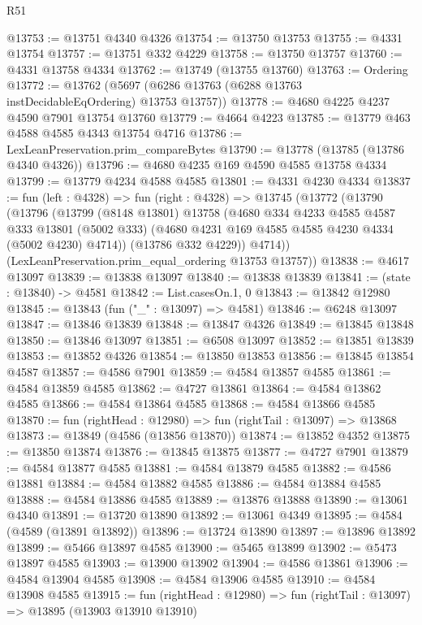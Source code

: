 \begin{lexlean}{R51}
\begin{coremodule}
@13753 := @13751 @4340 @4326
@13754 := @13750 @13753
@13755 := @4331 @13754
@13757 := @13751 @332 @4229
@13758 := @13750 @13757
@13760 := @4331 @13758 @4334
@13762 := @13749 (@13755 @13760)
@13763 := Ordering
@13772 := @13762 (@5697 (@6286 @13763 (@6288 @13763 instDecidableEqOrdering) @13753 @13757))
@13778 := @4680 @4225 @4237 @4590 @7901 @13754 @13760
@13779 := @4664 @4223
@13785 := @13779 @463 @4588 @4585 @4343 @13754 @4716
@13786 := LexLeanPreservation.prim_compareBytes
@13790 := @13778 (@13785 (@13786 @4340 @4326))
@13796 := @4680 @4235 @169 @4590 @4585 @13758 @4334
@13799 := @13779 @4234 @4588 @4585
@13801 := @4331 @4230 @4334
@13837 := fun (left : @4328) =>
  fun (right : @4328) =>
  @13745
    (@13772
      (@13790
        (@13796
          (@13799
            (@8148 @13801)
            @13758
            (@4680
              @334
              @4233
              @4585
              @4587
              @333
              @13801
              (@5002 @333)
              (@4680 @4231 @169 @4585 @4585 @4230 @4334 (@5002 @4230) @4714))
            (@13786 @332 @4229))
          @4714))
      (LexLeanPreservation.prim_equal_ordering @13753 @13757))
@13838 := @4617 @13097
@13839 := @13838 @13097
@13840 := @13838 @13839
@13841 := (state : @13840) -> @4581
@13842 := List.casesOn.{1, 0}
@13843 := @13842 @12980
@13845 := @13843 (fun ("_" : @13097) => @4581)
@13846 := @6248 @13097
@13847 := @13846 @13839
@13848 := @13847 @4326
@13849 := @13845 @13848
@13850 := @13846 @13097
@13851 := @6508 @13097
@13852 := @13851 @13839
@13853 := @13852 @4326
@13854 := @13850 @13853
@13856 := @13845 @13854 @4587
@13857 := @4586 @7901
@13859 := @4584 @13857 @4585
@13861 := @4584 @13859 @4585
@13862 := @4727 @13861
@13864 := @4584 @13862 @4585
@13866 := @4584 @13864 @4585
@13868 := @4584 @13866 @4585
@13870 := fun (rightHead : @12980) => fun (rightTail : @13097) => @13868
@13873 := @13849 (@4586 (@13856 @13870))
@13874 := @13852 @4352
@13875 := @13850 @13874
@13876 := @13845 @13875
@13877 := @4727 @7901
@13879 := @4584 @13877 @4585
@13881 := @4584 @13879 @4585
@13882 := @4586 @13881
@13884 := @4584 @13882 @4585
@13886 := @4584 @13884 @4585
@13888 := @4584 @13886 @4585
@13889 := @13876 @13888
@13890 := @13061 @4340
@13891 := @13720 @13890
@13892 := @13061 @4349
@13895 := @4584 (@4589 (@13891 @13892))
@13896 := @13724 @13890
@13897 := @13896 @13892
@13899 := @5466 @13897 @4585
@13900 := @5465 @13899
@13902 := @5473 @13897 @4585
@13903 := @13900 @13902
@13904 := @4586 @13861
@13906 := @4584 @13904 @4585
@13908 := @4584 @13906 @4585
@13910 := @4584 @13908 @4585
@13915 := fun (rightHead : @12980) => fun (rightTail : @13097) => @13895 (@13903 @13910 @13910)

\end{coremodule}
\end{lexlean}

